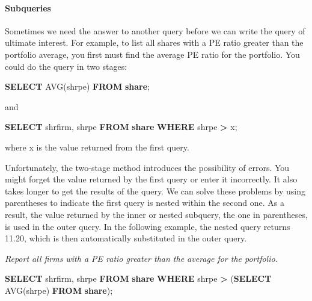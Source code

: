 \documentclass[
]{article}
\newenvironment{Shaded}{\begin{snugshade}}{\end{snugshade}}
\newcommand{\FunctionTok}[1]{\textcolor[rgb]{0.00,0.00,0.00}{#1}}
\newcommand{\KeywordTok}[1]{\textcolor[rgb]{0.13,0.29,0.53}{\textbf{#1}}}
\newcommand{\NormalTok}[1]{#1}
\newcommand{\OperatorTok}[1]{\textcolor[rgb]{0.81,0.36,0.00}{\textbf{#1}}}
\begin{document}
\hypertarget{subqueries}{%
\paragraph*{Subqueries}\label{subqueries}}

Sometimes we need the answer to another query before we can write the query of ultimate interest. For example, to list all shares with a PE ratio greater than the portfolio average, you first must find the average PE ratio for the portfolio. You could do the query in two stages:

\begin{Shaded}
\begin{Highlighting}[]
\KeywordTok{SELECT} \FunctionTok{AVG}\NormalTok{(shrpe) }\KeywordTok{FROM} \KeywordTok{share}\NormalTok{;}
\end{Highlighting}
\end{Shaded}

and

\begin{Shaded}
\begin{Highlighting}[]
\KeywordTok{SELECT}\NormalTok{ shrfirm, shrpe }\KeywordTok{FROM} \KeywordTok{share} \KeywordTok{WHERE}\NormalTok{ shrpe }\OperatorTok{\textgreater{}}\NormalTok{ x;}
\end{Highlighting}
\end{Shaded}

where x is the value returned from the first query.

Unfortunately, the two-stage method introduces the possibility of errors. You might forget the value returned by the first query or enter it incorrectly. It also takes longer to get the results of the query. We can solve these problems by using parentheses to indicate the first query is nested within the second one. As a result, the value returned by the inner or nested subquery, the one in parentheses, is used in the outer query. In the following example, the nested query returns 11.20, which is then automatically substituted in the outer query.

\emph{Report all firms with a PE ratio greater than the average for the portfolio.}

\begin{Shaded}
\begin{Highlighting}[]
\KeywordTok{SELECT}\NormalTok{ shrfirm, shrpe }\KeywordTok{FROM} \KeywordTok{share}
  \KeywordTok{WHERE}\NormalTok{ shrpe }\OperatorTok{\textgreater{}}\NormalTok{ (}\KeywordTok{SELECT} \FunctionTok{AVG}\NormalTok{(shrpe) }\KeywordTok{FROM} \KeywordTok{share}\NormalTok{);}
\end{Highlighting}
\end{Shaded}
\end{document}

